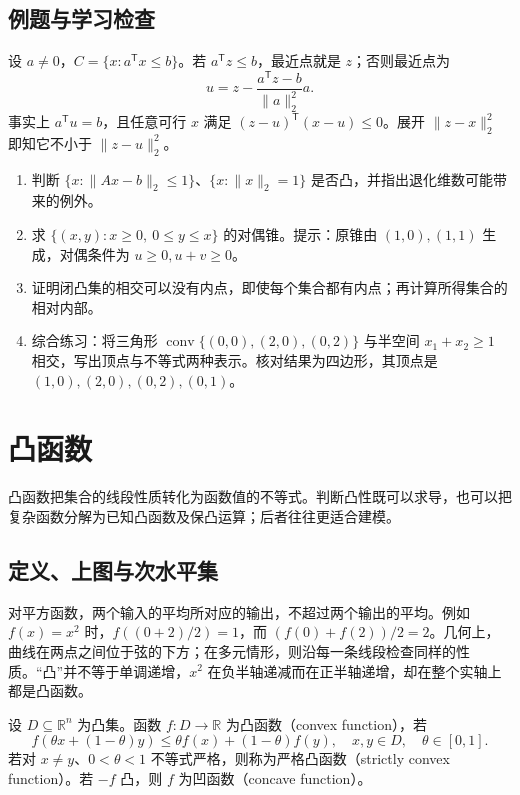 \documentclass[UTF8,12pt,a4paper,fontset=fandol]{ctexbook}
\begin{document}
\section{例题与学习检查}
\begin{example}[到半空间的投影]
设 $a\ne0$，$C=\{x:a^{\mathsf T}x\leq b\}$。若 $a^{\mathsf T}z\leq b$，最近点就是 $z$；否则最近点为
\[
 u=z-\frac{a^{\mathsf T}z-b}{\|a\|_2^2}a.
\]
事实上 $a^{\mathsf T}u=b$，且任意可行 $x$ 满足 $(z-u)^{\mathsf T}(x-u)\leq0$。展开 $\|z-x\|_2^2$ 即知它不小于 $\|z-u\|_2^2$。
\end{example}
\begin{enumerate}
 \item 判断 $\{x:\|Ax-b\|_2\leq1\}$、$\{x:\|x\|_2=1\}$ 是否凸，并指出退化维数可能带来的例外。
 \item 求 $\{(x,y):x\geq0,\ 0\leq y\leq x\}$ 的对偶锥。提示：原锥由 $(1,0),(1,1)$ 生成，对偶条件为 $u\geq0,u+v\geq0$。
 \item 证明闭凸集的相交可以没有内点，即使每个集合都有内点；再计算所得集合的相对内部。
 \item 综合练习：将三角形 $\operatorname{conv}\{(0,0),(2,0),(0,2)\}$ 与半空间 $x_1+x_2\geq1$ 相交，写出顶点与不等式两种表示。核对结果为四边形，其顶点是 $(1,0),(2,0),(0,2),(0,1)$。
\end{enumerate}

\chapter{凸函数}
\label{ch:co-functions}

凸函数把集合的线段性质转化为函数值的不等式。判断凸性既可以求导，也可以把复杂函数分解为已知凸函数及保凸运算；后者往往更适合建模。

\section{定义、上图与次水平集}

对平方函数，两个输入的平均所对应的输出，不超过两个输出的平均。例如 $f(x)=x^2$ 时，$f((0+2)/2)=1$，而 $(f(0)+f(2))/2=2$。几何上，曲线在两点之间位于弦的下方；在多元情形，则沿每一条线段检查同样的性质。“凸”并不等于单调递增，$x^2$ 在负半轴递减而在正半轴递增，却在整个实轴上都是凸函数。

\begin{definition}
设 $D\subseteq\mathbb R^n$ 为凸集。函数 $f:D\to\mathbb R$ 为凸函数（convex function），若
\begin{equation}
 f(\theta x+(1-\theta)y)\leq\theta f(x)+(1-\theta)f(y),
 \quad x,y\in D,\quad\theta\in[0,1].
 \label{eq:co-convex-function}
\end{equation}
若对 $x\ne y$、$0<\theta<1$ 不等式严格，则称为严格凸函数（strictly convex function）。若 $-f$ 凸，则 $f$ 为凹函数（concave function）。
\end{definition}
\end{document}
